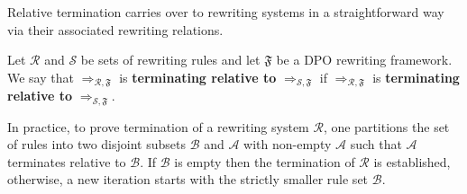 Relative termination 
carries over to rewriting systems in a straightforward way via their associated rewriting relations.
\begin{definition}
    \label{termination:def:relative_termination}
     Let $\mathcal{R}$ and $\mathcal{S}$ be sets of rewriting rules and let $\mathfrak{F}$ be a DPO rewriting framework. 
     We say that $\mathop{\Rightarrow}_{\mathcal{R},\mathfrak{F}}$ is \textbf{terminating relative to} $\mathop{\Rightarrow}_{\mathcal{S}, \mathfrak{F}}$ if 
     $\mathop{\Rightarrow}_{\mathcal{R},\mathfrak{F}}$ is \textbf{terminating relative to} $\mathop{\Rightarrow}_{\mathcal{S}, \mathfrak{F}}$.
\end{definition}
In practice, to prove termination of a rewriting system $\mathcal{R}$, one partitions the set of rules into two disjoint subsets \( \mathcal{B} \) and \( \mathcal{A} \) with non-empty $\mathcal{A}$ such that \( \mathcal{A} \) terminates relative to \( \mathcal{B} \). 
If $\mathcal{B}$ is empty then the termination of $\mathcal{R}$ is established, otherwise, a new iteration starts with the strictly smaller rule set $\mathcal{B}$.
 